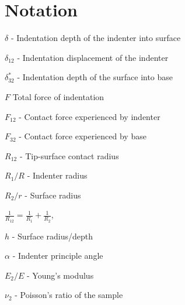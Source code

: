 \section{Notation}
$\delta$ - Indentation depth of the indenter into surface

$\delta_{12}$ - Indentation displacement of the indenter 

$\delta^*_{32}$ - Indentation depth of the surface into base

$F$ Total force of indentation

$F_{12}$ - Contact force experienced by indenter

$F_{32}$  - Contact force experienced by base

$R_{12}$ - Tip-surface contact radius 

$R_1/ R$ - Indenter radius

$R_2/ r$ - Surface radius 

$\frac{1}{R_{12}} = \frac{1}{R_{1}} + \frac{1}{R_{2}} $, 
 
$h$ - Surface radius/depth

$\alpha$ - Indenter principle angle

$E_2/ E$ - Young’s modulus

$\nu_2$ - Poisson’s ratio of the sample

\newpage


